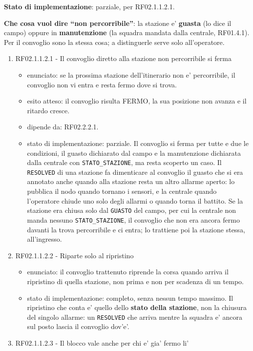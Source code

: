 \documentclass[11pt]{article}
\begin{document}
\begin{enumerate}
\textbf{Stato di implementazione}: parziale, per RF02.1.1.2.1.

\textbf{Che cosa vuol dire ``non percorribile''}: la stazione e' \textbf{guasta} (lo dice il campo) oppure in
\textbf{manutenzione} (la squadra mandata dalla centrale, RF01.4.1). Per il convoglio sono la stessa cosa;
a distinguerle serve solo all'operatore.
\begin{enumerate}
\item RF02.1.1.2.1 - Il convoglio diretto alla stazione non percorribile si ferma
\label{sec:org3c07b8d}
\begin{itemize}
\item enunciato: se la prossima stazione dell'itinerario non e' percorribile, il convoglio non vi entra e
resta fermo dove si trova.
\item esito atteso: il convoglio risulta FERMO, la sua posizione non avanza e il ritardo cresce.
\item dipende da: RF02.2.2.1.
\item stato di implementazione: parziale. Il convoglio si ferma per tutte e due le condizioni, il
guasto dichiarato dal campo e la manutenzione dichiarata dalla centrale con \texttt{STATO\_STAZIONE}, ma
resta scoperto un caso. Il \texttt{RESOLVED} di una stazione fa dimenticare al convoglio il guasto che si
era annotato anche quando alla stazione resta un altro allarme aperto: lo pubblica il nodo quando
tornano i sensori, e la centrale quando l'operatore chiude uno solo degli allarmi o quando torna
il battito. Se la stazione era chiusa solo dal \texttt{GUASTO} del campo, per cui la centrale non manda
nessuno \texttt{STATO\_STAZIONE}, il convoglio che non era ancora fermo davanti la trova percorribile e ci
entra; lo trattiene poi la stazione stessa, all'ingresso.
\end{itemize}
\item RF02.1.1.2.2 - Riparte solo al ripristino
\label{sec:org2715f90}
\begin{itemize}
\item enunciato: il convoglio trattenuto riprende la corsa quando arriva il ripristino di quella
stazione, non prima e non per scadenza di un tempo.
\item stato di implementazione: completo, senza nessun tempo massimo. Il ripristino che conta e' quello
dello \textbf{stato della stazione}, non la chiusura del singolo allarme: un \texttt{RESOLVED} che arriva mentre
la squadra e' ancora sul posto lascia il convoglio dov'e'.
\end{itemize}
\item RF02.1.1.2.3 - Il blocco vale anche per chi e' gia' fermo li'

\end{enumerate}
\end{enumerate}
\end{document}
